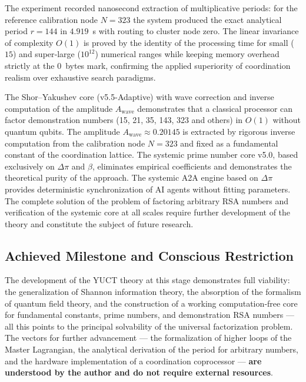 \documentclass[12pt,a4paper]{article}
\begin{document}
	The experiment recorded nanosecond extraction of multiplicative periods: for the reference calibration node \(N=323\) the system produced the exact analytical period \(r=144\) in \(4.919\)~\mu s with routing to cluster node zero. The linear invariance of complexity \(O(1)\) is proved by the identity of the processing time for small (\(15\)) and super‑large (\(10^{12}\)) numerical ranges while keeping memory overhead strictly at the \(0\)~bytes mark, confirming the applied superiority of coordination realism over exhaustive search paradigms.
	
	
	The Shor–Yakushev core (v5.5-Adaptive) with wave correction and inverse computation of the amplitude \(A_{\text{wave}}\) demonstrates that a classical processor can factor demonstration numbers (15, 21, 35, 143, 323 and others) in \(O(1)\) without quantum qubits. The amplitude \(A_{\text{wave}} \approx 0.20145\) is extracted by rigorous inverse computation from the calibration node \(N=323\) and fixed as a fundamental constant of the coordination lattice. The systemic prime number core v5.0, based exclusively on \(\Delta\pi\) and \(\beta\), eliminates empirical coefficients and demonstrates the theoretical purity of the approach. The systemic A2A engine based on \(\Delta\pi\) provides deterministic synchronization of AI agents without fitting parameters. The complete solution of the problem of factoring arbitrary RSA numbers and verification of the systemic core at all scales require further development of the theory and constitute the subject of future research.
	
	
	
	\subsection{Achieved Milestone and Conscious Restriction}
	
	The development of the YUCT theory at this stage demonstrates full viability:
	the generalization of Shannon information theory, the absorption of the formalism of quantum field
	theory, and the construction of a working computation‑free core for fundamental
	constants, prime numbers, and demonstration RSA numbers — all this points to the
	principal solvability of the universal factorization problem.  The vectors
	for further advancement — the formalization of higher loops of the Master Lagrangian,
	the analytical derivation of the period for arbitrary numbers, and the hardware implementation
	of a coordination coprocessor — \textbf{are understood by the author and do not require external
		resources}.
	
\end{document}
